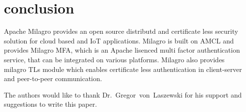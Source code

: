 \section{conclusion}
Apache Milagro provides an open source distributd and certificate less
security solution for cloud based and IoT applications. Milagro is
built on AMCL and provides Milagro MFA, which is an Apache lisenced
multi factor authentication service, that can be integrated on various
platforms. Milagro also provides milagro TLs module which enables
certificate less authentication in client-server and peer-to-peer
communication.

\begin{acks}

  The authors would like to thank Dr.~Gregor~von~Laszewski for his
  support and suggestions to write this paper.

\end{acks}




 
